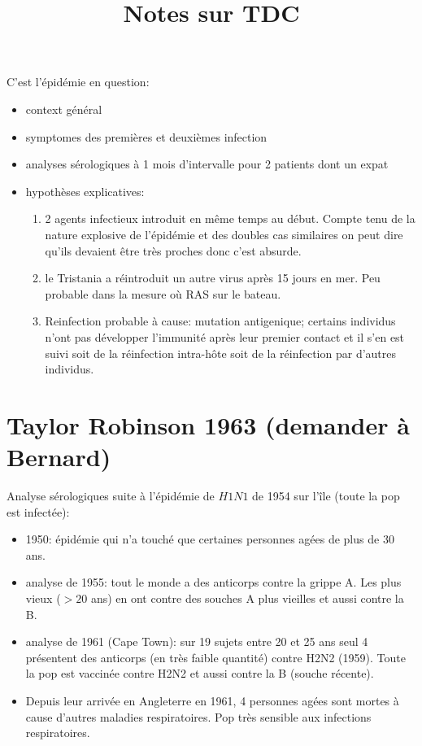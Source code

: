 \documentclass{article}
\title{Notes sur TDC}
\begin{document}
\maketitle

\section{\citet{Mantle1973}}
C'est l'épidémie en question:
\begin{itemize}
\item context général
\item symptomes des premières et deuxièmes infection
\item analyses sérologiques à 1 mois d'intervalle pour 2 patients dont un expat
\item hypothèses explicatives:
\begin{enumerate}
\item 2 agents infectieux introduit en même temps au début. Compte tenu de la nature explosive de l'épidémie et des doubles cas similaires on peut dire qu'ils devaient être très proches donc c'est absurde.
\item le Tristania a réintroduit un autre virus après 15 jours en mer. Peu probable dans la mesure où RAS sur le bateau.
\item Reinfection probable à cause: mutation antigenique; certains individus n'ont pas développer l'immunité après leur premier contact et il s'en est suivi soit de la réinfection intra-hôte soit de la réinfection par d'autres individus.
\end{enumerate}
\end{itemize}

\section{Taylor Robinson 1963 (demander à Bernard)}
Analyse sérologiques suite à l'épidémie de $H1N1$ de 1954 sur l'île (toute la pop est infectée):
\begin{itemize}
\item 1950: épidémie qui n'a touché que certaines personnes agées de plus de 30 ans.
\item analyse de 1955: tout le monde a des anticorps contre la grippe A. Les plus vieux ($>20$ ans) en ont contre des souches A plus vieilles et aussi contre la B.
\item analyse de 1961 (Cape Town): sur 19 sujets entre 20 et 25 ans seul 4 présentent des anticorps (en très faible quantité) contre H2N2 (1959). Toute la pop est vaccinée contre H2N2 et aussi contre la B (souche récente).
\item Depuis leur arrivée en Angleterre en 1961, 4 personnes agées sont mortes à cause d'autres maladies respiratoires. Pop très sensible aux infections respiratoires.
\end{itemize}
\end{document}
